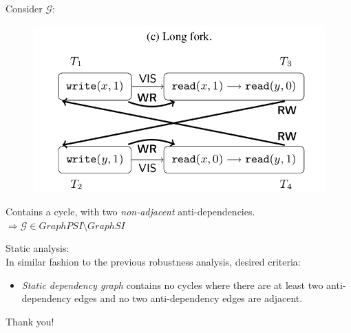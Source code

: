 \documentclass{beamer}
\begin{document}
\begin{frame}
	Consider $\mathcal{G}$:
	\begin{figure}
		\includegraphics[scale=0.25]{fig2c}
	\end{figure}
	\begin{example}
		Contains a cycle, with two \textit{non-adjacent} anti-dependencies.
		$\Rightarrow \mathcal{G} \in GraphPSI \setminus GraphSI$
	\end{example}
\end{frame}

\begin{frame}
	Static analysis: \\
	In similar fashion to the previous robustness analysis, desired criteria:
	\begin{itemize}
		\item \textit{Static dependency graph} contains no cycles where there are at least two anti-dependency edges and no two anti-dependency edges are adjacent.
	\end{itemize}
\end{frame}

\begin{frame}
	\begin{center}
		Thank you!
	\end{center}
\end{frame}
\end{document}
